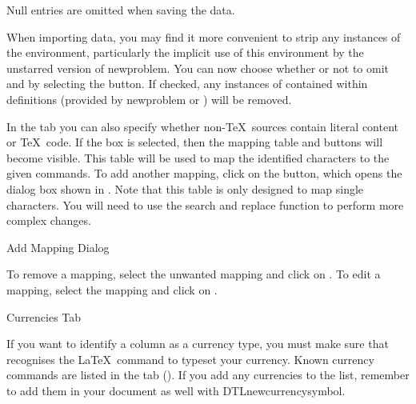 \begin{information}
Null entries are omitted when saving the data.
\end{information}

When importing  data, you may find it more convenient
to strip any instances of the  environment, 
particularly the implicit use of this environment by the
unstarred version of \gls{newproblem}. You can now choose whether or 
not to omit  and 
by selecting the  button.
If checked, any instances of  contained within 
definitions (provided by \gls{newproblem} or ) 
will be removed.

In the  tab you can also specify whether 
non-\TeX\ sources contain literal content or \TeX\ code.
If the  box is selected,
then the mapping table and buttons will become visible.
This table will be used to map the identified characters to
the given commands. To add another mapping, click on the
 button, which opens the dialog box
shown in . Note that this table is only
designed to map single characters. You will need to use the search
and replace function to perform more complex changes.

 {%
 }
 {Add Mapping Dialog}

    To remove a mapping, select the unwanted mapping and click on 
    . To edit a mapping,
    select the mapping and click on .


 {%
 }
 {Currencies Tab}


If you want to identify a column as a currency type, you 
must make sure that  recognises the \LaTeX\ command to typeset
your currency. Known currency commands are listed in the 
 tab (). If you add any currencies
to the list, remember to add them in your document as well with 
\gls{DTLnewcurrencysymbol}.

